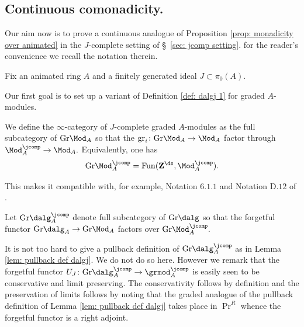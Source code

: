 \documentclass[10pt,reqno]{amsart}
\numberwithin{equation}{section}
\newcommand{\ZZ}{\mathbf{Z}}
\newcommand{\Gr}{\mathrm{Gr}}
\newcommand{\gr}{\mathrm{gr}}
\begin{document}
\subsection{Continuous comonadicity.}\label{ssec: continuous comonad}

Our aim now is to prove a continuous analogue of Proposition \ref{prop: monadicity over animated} in the $J$-complete setting of \S~\ref{sec: jcomp setting}. for the reader's convenience we recall the notation therein.

\begin{notation}\label{notation: jcomp redux}
Fix an animated ring $A$ and a finitely generated ideal $J\subset \pi_0(A).$
\end{notation}

Our first goal is to set up a variant of Definition \ref{def: dalgj 1} for graded $A$-modules.

\begin{recollection}\label{rec: def of gradedjcomp}
    We define the $\infty$-category of $J$-complete graded $A$-modules as the full subcategory of $\Gr\Mod_A$ so that the $\gr_i\colon \Gr\Mod_A\to \Mod_A$ factor through $\Mod_A^\jcomp\to \Mod_A.$ Equivalently, one has $$\Gr\Mod_A^\jcomp=\mathrm{Fun}(\ZZ^\ds,\Mod_A^\jcomp).$$

    This makes it compatible with, for example, Notation $6.1.1$ and Notation $\text{D}.12$ of \cite{APC}.
    
\end{recollection}


\begin{definition}\label{def: def of dalggradedjcomp}
    Let $\Gr\dalg_A^\jcomp$ denote full subcategory of $\Gr\dalg$ so that the forgetful functor $\Gr\dalg_A\to \Gr\Mod_A$ factors over $\Gr\Mod_A^\jcomp.$ 
\end{definition}

\begin{remark}\label{lem: not hard pullback}
    It is not too hard to give a pullback definition of $\Gr\dalg_A^\jcomp$ as in Lemma \ref{lem: pullback def dalgj}. We do not do so here. However we remark that the forgetful functor $U_J\colon \Gr\dalg_A^\jcomp\to \grmod_A^\jcomp$ is easily seen to be conservative and limit preserving. The conservativity follows by definition and the preservation of limits follows by noting that the graded analogue of the pullback definition of Lemma \ref{lem: pullback def dalgj} takes place in $\Pr^R$ whence the forgetful functor is a right adjoint.
\end{remark}
\end{document}
